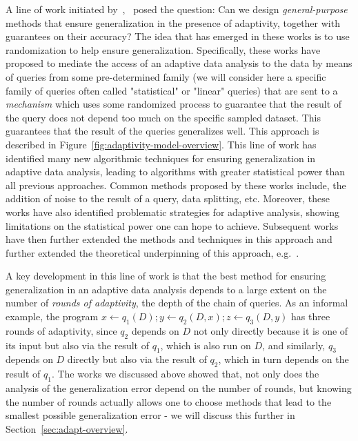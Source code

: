 A line of work initiated by~\cite{DworkFHPRR15},~\cite{HardtU14} posed the question: Can we design \emph{general-purpose} methods that ensure generalization in the presence of adaptivity, together with guarantees on their accuracy?  
The idea that has emerged in these works is to use randomization to help ensure generalization. 
Specifically, these works have proposed to mediate the access of an adaptive data analysis to the data by means of queries from some pre-determined family (we will consider here a specific family of queries often called "statistical" or "linear" queries) that are sent to a  \emph{mechanism} which uses some randomized process to guarantee that the result of the query does not depend too much on the specific
sampled dataset. 
This guarantees that the result of the queries generalizes well. This approach is described in Figure~\ref{fig:adaptivity-model-overview}.  
This line of work has identified many new algorithmic techniques for ensuring generalization in adaptive data analysis, leading to algorithms with greater statistical power than all previous approaches. Common methods proposed by these works include, the addition of noise to the result of a query, data splitting, etc. Moreover, these works have also identified problematic strategies for adaptive analysis, showing limitations on the statistical power one can hope to achieve. Subsequent works have then further extended the methods and techniques in this approach and further extended the theoretical underpinning of this approach, e.g.~\cite{stoc/DworkFHPRR15,DworkFHPRR15,BassilyNSSSU16,UllmanSNSS18,FeldmanS17,0001LN0SS21,SteinkeZ20,RogersRSSTW20}.

A key development in this line of work is that the best method for ensuring generalization in an adaptive data analysis depends to a large extent on the number of \emph{rounds of adaptivity}, the depth of the chain of queries. 
As an informal example, the program $x \leftarrow q_1(D);y \leftarrow q_2(D,x);z \leftarrow q_3(D,y)$ has three rounds of adaptivity, since $q_2$  depends on $D$ not only directly because it is one of its input but also via the result of $q_1$, which is also run on $D$, and similarly,  $q_3$ depends on $D$ directly but also via the result of $q_2$, which in turn depends on the result of $q_1$.
The works we discussed above showed that, not only does the analysis of the generalization error depend on the number of rounds, but knowing the number of rounds actually allows one to choose methods that lead to the smallest possible generalization error - we will discuss this further in Section~\ref{sec:adapt-overview}. 

